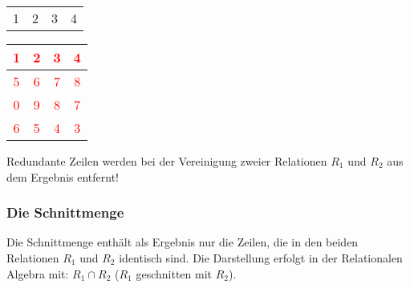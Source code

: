 \begin{center}
\begin{small}
\begin{minipage}[b]{.2\linewidth}
\begin{center}
\begin{supertabular}{|c|c|c|c|}
                     & 2 & 3 & 4  \\
                  \end{supertabular}
                \end{center}
              \end{minipage}
              \hfil
              \begin{minipage}[b]{.2\linewidth}
                \begin{center}
                  \tabletail{
                    \hline
                  }
                  \tablelasttail{
                    \hline
                  }
                  \begin{supertabular}{|c|c|c|c|}
                    \textcolor{red}{1} & \textcolor{red}{2} & \textcolor{red}{3} & \textcolor{red}{4} \\
                    \hline
                    \textcolor{red}{5} & \textcolor{red}{6} & \textcolor{red}{7} & \textcolor{red}{8} \\
                    \hline
                    \textcolor{red}{0} & \textcolor{red}{9} & \textcolor{red}{8} & \textcolor{red}{7} \\
                    \hline
                    \textcolor{red}{6} & \textcolor{red}{5} & \textcolor{red}{4} & \textcolor{red}{3} \\
                  \end{supertabular}
                \end{center}
              \end{minipage}
            \end{small}
          \end{center}
          \begin{merke}
            Redundante Zeilen werden bei der Vereinigung zweier Relationen $R_1$ und $R_2$ aus dem Ergebnis entfernt!
          \end{merke}
        \subsubsection{Die Schnittmenge}
          Die Schnittmenge enthält als Ergebnis nur die Zeilen, die in den beiden Relationen $R_1$ und $R_2$ identisch sind. Die Darstellung erfolgt in der Relationalen Algebra mit: $R_1\cap R_2$ ($R_1$ geschnitten mit $R_2$).

